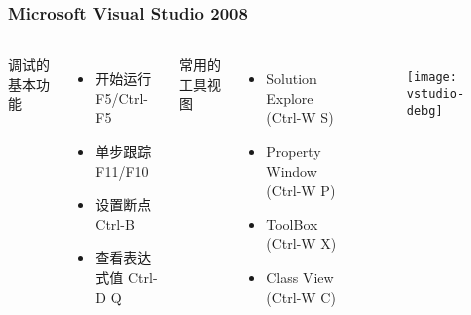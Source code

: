 \begin{frame}
\frametitle{Microsoft Visual Studio 2008}
\begin{columns}
调试的基本功能
  \begin{itemize}
  \item 开始运行 F5/Ctrl-F5
  \item 单步跟踪 F11/F10
  \item 设置断点 Ctrl-B
  \item 查看表达式值 Ctrl-D Q
  \end{itemize}
常用的工具视图
  \begin{itemize}
  \item Solution Explore (Ctrl-W S)
  \item Property Window (Ctrl-W P)
  \item ToolBox (Ctrl-W X)
  \item Class View (Ctrl-W C)
  \end{itemize}
\begin{figure}
  \centering
  \texttt{[image: vstudio-debg]}
\end{figure}
\end{columns}
\end{frame}


